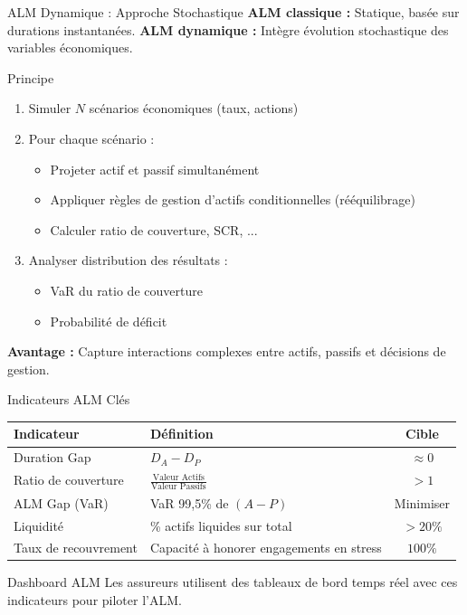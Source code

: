 \documentclass[10pt,aspectratio=169,xcolor={dvipsnames}]{beamer}
\begin{document}
\begin{frame}{ALM Dynamique : Approche Stochastique}
\textbf{ALM classique : } Statique, basée sur durations instantanées.
\textbf{ALM dynamique : } Intègre évolution stochastique des variables économiques.

\vspace{0.3cm}
\begin{block}{Principe}
\begin{enumerate}
    \item Simuler $N$ scénarios économiques (taux, actions)
    \item Pour chaque scénario :
    \begin{itemize}
        \item Projeter actif et passif simultanément
        \item Appliquer règles de gestion d'actifs conditionnelles (rééquilibrage)
        \item Calculer ratio de couverture, SCR, ...
    \end{itemize}
    \item Analyser distribution des résultats :
    \begin{itemize}
        \item VaR du ratio de couverture
        \item Probabilité de déficit
    \end{itemize}
\end{enumerate}
\end{block}

\vspace{0.3cm}
\textbf{Avantage : } Capture interactions complexes entre actifs, passifs et décisions de gestion.
\end{frame}

\begin{frame}{Indicateurs ALM Clés}
\begin{table}
\centering
\small
\begin{tabular}{lp{6cm}c}
\toprule
\textbf{Indicateur} & \textbf{Définition} & \textbf{Cible} \\
\midrule
Duration Gap & $D_A - D_P$ & $\approx 0$ \\
\midrule
Ratio de couverture & $\frac{\text{Valeur Actifs}}{\text{Valeur Passifs}}$ & $> 1$ \\
\midrule
ALM Gap (VaR) & VaR 99,5\% de $(A - P)$ & Minimiser \\
\midrule
Liquidité & \% actifs liquides sur total & $> 20\%$ \\
\midrule
Taux de recouvrement & Capacité à honorer engagements en stress & $100\%$ \\
\bottomrule
\end{tabular}
\end{table}

\vspace{0.3cm}
\begin{exampleblock}{Dashboard ALM}
Les assureurs utilisent des tableaux de bord temps réel avec ces indicateurs pour piloter l'ALM.
\end{exampleblock}
\end{frame}
\end{document}

